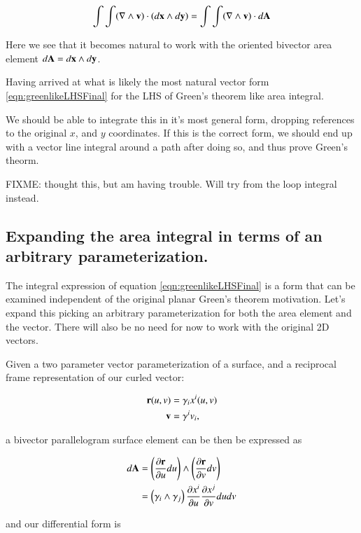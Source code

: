 \documentclass{article}
\newcommand{\grad}[0]{\nabla}
\newcommand{\PD}[2]{\frac{\partial {#2}}{\partial {#1}}}
\begin{document}
\begin{equation}\label{eqn:greenlikeLHSFinal}
\int\int (\grad \wedge \Bv) \cdot (d\Bx \wedge d\By) = \int\int (\grad \wedge \Bv) \cdot d\BA
\end{equation}

Here we see that it becomes natural to work with the oriented bivector area element $d\mathbf{A} = d\mathbf{x} \wedge d\mathbf{y}$.

Having arrived at what is likely the most natural vector form \ref{eqn:greenlikeLHSFinal} for the LHS of Green's theorem like
area integral.

We should be able to 
integrate this in it's most general form, dropping references to the original $x$, and $y$ coordinates.
If this is the correct form, we should end up with a vector line integral around a path after doing so, and thus prove
Green's theorm.


FIXME: thought this, but am having trouble.  Will try from the loop integral instead.

\subsection{ Expanding the area integral in terms of an arbitrary parameterization. }

The integral expression of equation \ref{eqn:greenlikeLHSFinal} is a form that can be examined independent of the original planar Green's theorem motivation.  Let's expand
this picking an arbitrary parameterization for both the area element and the vector.  There will also be no need for now to work with the original 2D vectors.

Given a two parameter vector parameterization of a surface, and a reciprocal frame representation of our curled vector:

\begin{align*}
\mathbf{r}(u,v) &= \gamma_i {x^i}(u,v) \\
\mathbf{v} &= \gamma^i {v_i},
\end{align*}

a bivector parallelogram surface element can be then be expressed as

\begin{align*}
d\BA 
&= \left(\PD{u}{\Br} du\right) \wedge \left(\PD{v}{\Br} dv\right) \\
&= \left(\gamma_i \wedge \gamma_j \right) \PD{u}{x^i} \PD{v}{x^j} du dv \\
\end{align*}

and our differential form is
\end{document}
